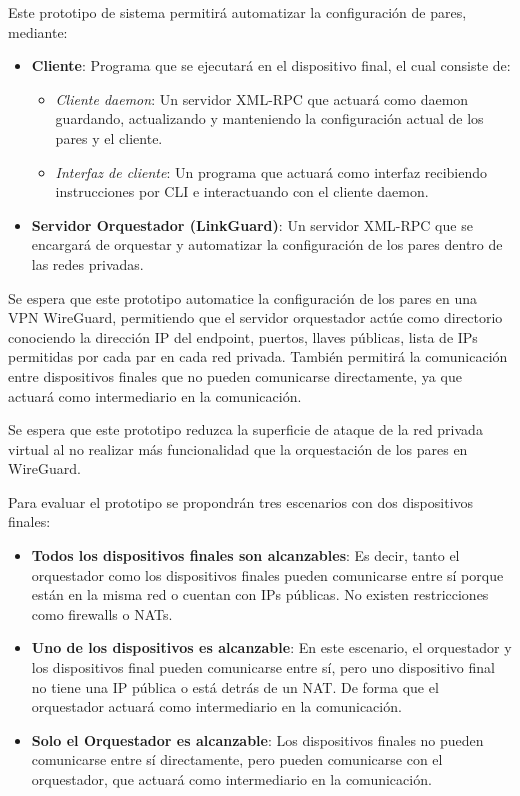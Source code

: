 Este prototipo de sistema permitirá automatizar la configuración de pares, mediante:
\begin{itemize}
    \item \textbf{Cliente}: Programa que se ejecutará en el dispositivo final, el cual consiste de:
    \begin{itemize}
        \item \textit{Cliente daemon}: Un servidor XML-RPC que actuará como daemon guardando, actualizando y manteniendo la configuración actual de los pares y el cliente.
        \item \textit{Interfaz de cliente}: Un programa que actuará como interfaz recibiendo instrucciones por CLI e interactuando con el cliente daemon.
    \end{itemize}
    \item \textbf{Servidor Orquestador (LinkGuard)}: Un servidor XML-RPC que se encargará de orquestar y automatizar la configuración de los pares dentro de las redes privadas.
\end{itemize}


Se espera que este prototipo automatice la configuración de los pares en una VPN WireGuard, permitiendo que el servidor orquestador actúe como directorio conociendo la dirección IP del endpoint, puertos, llaves públicas, lista de IPs permitidas por cada par en cada red privada. También permitirá la comunicación entre dispositivos finales que no pueden comunicarse directamente, ya que actuará como intermediario en la comunicación.

Se espera que este prototipo reduzca la superficie de ataque de la red privada virtual al no realizar más funcionalidad que la orquestación de los pares en WireGuard. 


Para evaluar el prototipo se propondrán tres escenarios con dos dispositivos finales:
\begin{itemize}
    \item \textbf{Todos los dispositivos finales son alcanzables}: Es decir, tanto el orquestador como los dispositivos finales pueden comunicarse entre sí porque están en la misma red o cuentan con IPs públicas. No existen restricciones como firewalls o NATs.
    
    \item \textbf{Uno de los dispositivos es alcanzable}: En este escenario, el orquestador y los dispositivos final pueden comunicarse entre sí, pero uno dispositivo final no tiene una IP pública o está detrás de un NAT. De forma que el orquestador actuará como intermediario en la comunicación.
    
    \item \textbf{Solo el Orquestador es alcanzable}: Los dispositivos finales no pueden comunicarse entre sí directamente, pero pueden comunicarse con el orquestador, que actuará como intermediario en la comunicación.
\end{itemize}
